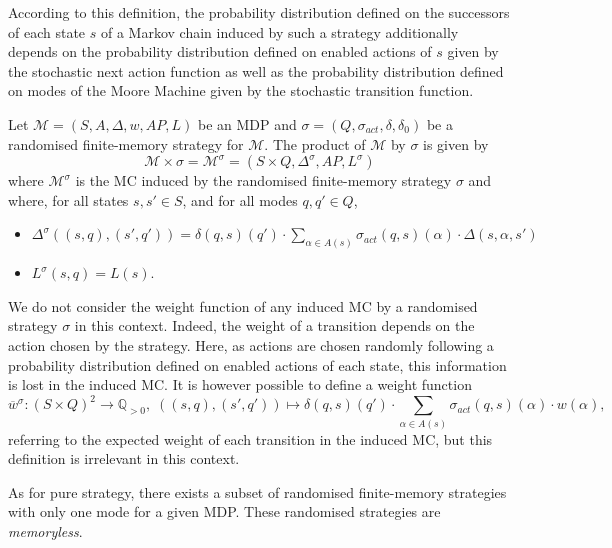 According to this definition, the probability distribution defined on the successors of each state $s$ of a Markov chain induced by such a strategy additionally depends on the probability distribution defined on enabled actions of $s$ given by the stochastic next action function as well as the probability distribution defined on modes of the Moore Machine given by the stochastic transition function.

\begin{definition}
  Let $\mathcal{M}=(S, A, \Delta, w, AP, L)$ be an MDP and $\sigma=(Q, \sigma_{act}, \delta, \delta_0)$ be a randomised finite-memory strategy for $\mathcal{M}$.
  The product of $\mathcal{M}$ by $\sigma$ is given by
  \[
    \mathcal{M} \times \sigma = \mathcal{M}^\sigma = (S \times Q, \Delta^\sigma, AP, L^\sigma)
  \]
  where $\mathcal{M}^\sigma$ is the MC induced by the randomised finite-memory strategy $\sigma$ and where, for all states $s, s' \in S$, and for all modes $q, q' \in Q$,
  \begin{itemize}
    \item $\Delta^\sigma((s, q), (s', q')) =
    \delta(q, s)(q') \cdot \sum_{\alpha \in A(s)} \sigma_{act}(q, s)(\alpha) \cdot \Delta(s, \alpha, s')$
    \item $L^\sigma(s, q) = L(s)$.
  \end{itemize}
\end{definition}

\begin{remark}
  We do not consider the weight function of any induced MC by a randomised strategy $\sigma$ in this context.
  Indeed, the weight of a transition depends on the action chosen by the strategy. Here, as actions are chosen randomly following a probability distribution defined on enabled actions of each state, this information is lost in the induced MC.
  It is however possible to define a weight function
  \[
    \overline{w}^\sigma: (S \times Q)^2 \rightarrow \mathbb{Q}_{>0}, \; ((s, q), (s', q')) \mapsto \delta(q, s)(q') \cdot \sum_{\alpha \in A(s)} \sigma_{act}(q, s)(\alpha) \cdot w(\alpha),
  \]
  referring to the expected weight of each transition in the induced MC, but this definition is irrelevant in this context.
\end{remark}

As for pure strategy, there exists a subset of randomised finite-memory strategies with only one mode for a given MDP.
These randomised strategies are \textit{memoryless}.

